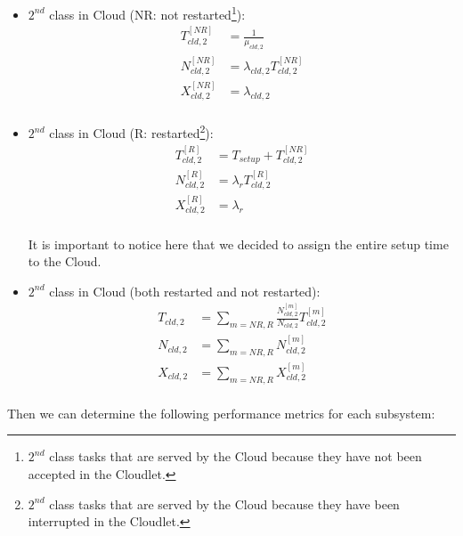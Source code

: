 \begin{itemize}
	\item $2^{nd}$ class in Cloud (NR: not restarted\footnote{$2^{nd}$ class tasks that are served by the Cloud because they have not been accepted in the Cloudlet.}):
	\begin{equation} 
	\begin{split}
		T_{cld,2}^{[NR]} &= \frac{1}{\mu_{cld,2}} \\
		N_{cld,2}^{[NR]} &= \lambda_{cld,2}T_{cld,2}^{[NR]} \\
		X_{cld,2}^{[NR]} &= \lambda_{cld,2} \\
	\end{split}
	\end{equation}
	
	\item $2^{nd}$ class in Cloud (R: restarted\footnote{$2^{nd}$ class tasks that are served by the Cloud because they have been interrupted in the Cloudlet.}):
	\begin{equation} 
	\begin{split}
		T_{cld,2}^{[R]} &= T_{setup}+ T_{cld,2}^{[NR]} \\
		N_{cld,2}^{[R]} &= \lambda_{r} T_{cld,2}^{[R]} \\
		X_{cld,2}^{[R]} &= \lambda_{r} \\
	\end{split}
	\end{equation}

	It is important to notice here that we decided to assign the entire setup time to the Cloud.
	
	\item $2^{nd}$ class in Cloud (both restarted and not restarted):
	\begin{equation} 
	\begin{split}
		T_{cld,2} &= \sum_{m=NR,R} \frac{N_{cld,2}^{[m]}}{N_{cld,2}}T_{cld,2}^{[m]} \\
		N_{cld,2} &= \sum_{m=NR,R} N_{cld,2}^{[m]} \\
		X_{cld,2} &= \sum_{m=NR,R} X_{cld,2}^{[m]} \\
	\end{split}
	\end{equation}
\end{itemize}

Then we can determine the following performance metrics for each subsystem:

